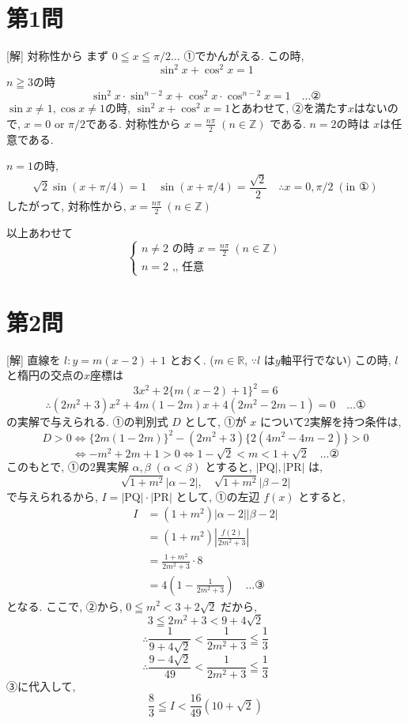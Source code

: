 \documentclass[../main.tex]{subfiles}
\begin{document}
\section*{第1問}

[解] 対称性から まず $0 \leqq x \leqq \pi/2 \dots$ ①でかんがえる. この時,
\[
  \sin^2 x + \cos^2 x = 1
\]
$n \geqq 3$の時
\begin{equation}
  \sin^2 x \cdot \sin^{n-2} x + \cos^2 x \cdot \cos^{n-2} x = 1 \quad \dots \text{②}
\end{equation}
$\sin x \neq 1, \cos x \neq 1$の時, $\sin^2 x + \cos^2 x = 1$とあわせて, ②を満たす$x$はないので, $x = 0 \text{ or } \pi/2$である. 対称性から $x = \frac{n\pi}{2} \; (n \in \mathbb{Z})$ である. $n=2$の時は $x$は任意である.

$n=1$の時,
\[
  \sqrt{2}\sin(x+\pi/4) = 1 \quad \sin(x+\pi/4) = \frac{\sqrt{2}}{2} \quad \therefore x = 0, \pi/2 \; (\text{in } \text{①})
\]
したがって, 対称性から, $x = \frac{n\pi}{2} \; (n \in \mathbb{Z})$

以上あわせて
\[
  \begin{cases}
    n \neq 2 \text{ の時 } x = \frac{n\pi}{2} \; (n \in \mathbb{Z}) \\
    n = 2 \text{ ,, } \text{任意}
  \end{cases}
\]

\section*{第2問}

[解] 直線を $l : y = m(x-2) + 1$ とおく. ($m \in \mathbb{R}$, $\because l$ は$y$軸平行でない) この時, $l$と楕円の交点の$x$座標は
\[
  3x^2 + 2 \{ m(x-2) + 1 \}^2 = 6
\]
\[
  \therefore (2m^2+3)x^2 + 4m(1-2m)x + 4(2m^2-2m-1) = 0 \quad \dots \text{①}
\]
の実解で与えられる. ①の判別式 $D$ として, ①が $x$ について2実解を持つ条件は,
\[
  D > 0 \iff \{ 2m(1-2m) \}^2 - (2m^2+3) \{ 2(4m^2-4m-2) \} > 0
\]
\[
  \iff -m^2+2m+1 > 0 \iff 1-\sqrt{2} < m < 1+\sqrt{2} \quad \dots \text{②}
\]
このもとで, ①の2異実解 $\alpha, \beta \; (\alpha < \beta)$ とすると, $|\text{PQ}|, |\text{PR}|$ は,
\[
  \sqrt{1+m^2}|\alpha-2|, \quad \sqrt{1+m^2}|\beta-2|
\]
で与えられるから, $I = |\text{PQ}| \cdot |\text{PR}|$ として, ①の左辺 $f(x)$ とすると,
\begin{align*}
  I &= (1+m^2)|\alpha-2||\beta-2| \\
  &= (1+m^2)\left| \frac{f(2)}{2m^2+3} \right| \\
  &= \frac{1+m^2}{2m^2+3} \cdot 8 \\
  &= 4 \left( 1 - \frac{1}{2m^2+3} \right) \quad \dots \text{③}
\end{align*}
となる. ここで, ②から, $0 \leqq m^2 < 3+2\sqrt{2}$ だから,
\[
  3 \leqq 2m^2+3 < 9+4\sqrt{2}
\]
\[
  \therefore \frac{1}{9+4\sqrt{2}} < \frac{1}{2m^2+3} \leqq \frac{1}{3}
\]
\[
  \therefore \frac{9-4\sqrt{2}}{49} < \frac{1}{2m^2+3} \leqq \frac{1}{3}
\]
③に代入して,
\[
  \frac{8}{3} \leqq I < \frac{16}{49}(10+\sqrt{2})
\]
\end{document}
